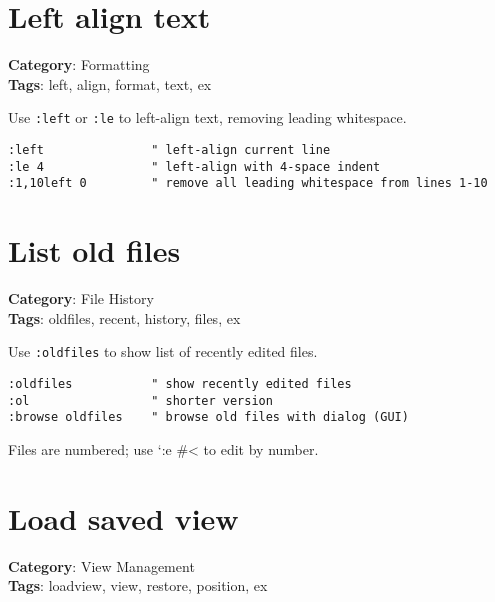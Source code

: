 {{{{{\section{Left align text}

\textbf{Category}: Formatting\\ \textbf{Tags}: left, align, format, text, ex
\vspace{0.5cm}

Use {\footnotesize \Verb§:left§} or {\footnotesize \Verb§:le§} to left-align text, removing leading whitespace.

\begin{Exa*}{}
\begin{Verbatim}[fontsize=\footnotesize, breaklines, breakanywhere]
:left               " left-align current line
:le 4               " left-align with 4-space indent
:1,10left 0         " remove all leading whitespace from lines 1-10
\end{Verbatim}
\end{Exa*}

\section{List old files}

\textbf{Category}: File History\\ \textbf{Tags}: oldfiles, recent, history, files, ex
\vspace{0.5cm}

Use {\footnotesize \Verb§:oldfiles§} to show list of recently edited files.

\begin{Exa*}{}
\begin{Verbatim}[fontsize=\footnotesize, breaklines, breakanywhere]
:oldfiles           " show recently edited files
:ol                 " shorter version
:browse oldfiles    " browse old files with dialog (GUI)
\end{Verbatim}
\end{Exa*}

Files are numbered; use `:e \#< to edit by number.

\section{Load saved view}

\textbf{Category}: View Management\\ \textbf{Tags}: loadview, view, restore, position, ex
\vspace{0.5cm}

}}}}}
